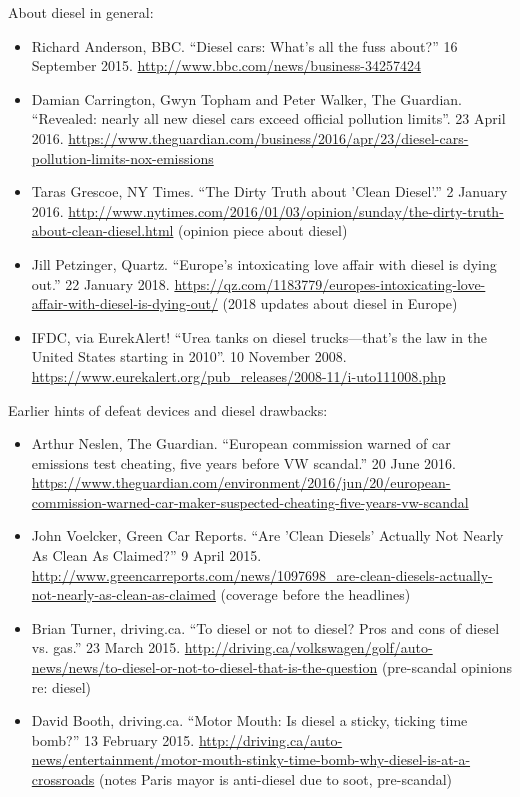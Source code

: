 \documentclass[11pt]{article}
\begin{document}
\noindent
About diesel in general:
\begin{itemize}
\item Richard Anderson, BBC. ``Diesel cars: What's all the fuss about?'' 16 September 2015. \url{http://www.bbc.com/news/business-34257424}
\item Damian Carrington, Gwyn Topham and Peter Walker, The Guardian. ``Revealed: nearly all new diesel cars exceed official pollution limits''. 23 April 2016. \url{https://www.theguardian.com/business/2016/apr/23/diesel-cars-pollution-limits-nox-emissions}
\item Taras Grescoe, NY Times. ``The Dirty Truth about 'Clean Diesel'.'' 2 January 2016. \url{http://www.nytimes.com/2016/01/03/opinion/sunday/the-dirty-truth-about-clean-diesel.html} (opinion piece about diesel)
\item Jill Petzinger, Quartz. ``Europe's intoxicating love affair with diesel is dying out.'' 22 January 2018. \url{https://qz.com/1183779/europes-intoxicating-love-affair-with-diesel-is-dying-out/} (2018 updates about diesel in Europe)
\item IFDC, via EurekAlert! ``Urea tanks on diesel trucks---that's the law in the United States starting in 2010''. 10 November 2008. \url{https://www.eurekalert.org/pub_releases/2008-11/i-uto111008.php}
\end{itemize}

\noindent
Earlier hints of defeat devices and diesel drawbacks:
\begin{itemize}
\item Arthur Neslen, The Guardian. ``European commission warned of car emissions test cheating, five years before VW scandal.'' 20 June 2016. \url{https://www.theguardian.com/environment/2016/jun/20/european-commission-warned-car-maker-suspected-cheating-five-years-vw-scandal}
\item John Voelcker, Green Car Reports. ``Are 'Clean Diesels' Actually Not Nearly As Clean As Claimed?'' 9 April 2015. \url{http://www.greencarreports.com/news/1097698_are-clean-diesels-actually-not-nearly-as-clean-as-claimed} (coverage before the headlines)
\item Brian Turner, driving.ca. ``To diesel or not to diesel? Pros and cons of diesel vs. gas.'' 23 March 2015. \url{http://driving.ca/volkswagen/golf/auto-news/news/to-diesel-or-not-to-diesel-that-is-the-question} (pre-scandal opinions re: diesel)
\item David Booth, driving.ca. ``Motor Mouth: Is diesel a sticky, ticking time bomb?'' 13 February 2015. \url{http://driving.ca/auto-news/entertainment/motor-mouth-stinky-time-bomb-why-diesel-is-at-a-crossroads} (notes Paris mayor is anti-diesel due to soot, pre-scandal)
\end{itemize}
\end{document}
